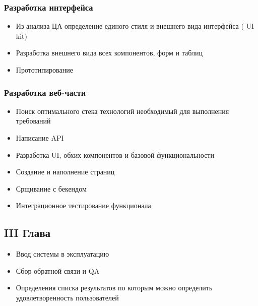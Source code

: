 \documentclass[14pt, timesnewroman]{article}
\begin{document}
\subsubsection{Разработка интерфейса}
\begin{itemize}
    \item Из анализа ЦА определение единого стиля и внешнего вида интерфейса ( UI kit)
    \item Разработка внешнего вида всех компонентов, форм и таблиц
    \item Прототипирование
\end{itemize}
\subsubsection{Разработка веб-части}
\begin{itemize}
    \item Поиск оптимального стека технологий необходимый для выполнения требований
    \item Написание API
    \item Разработка UI, обхих компонентов и базовой функциональности
    \item Создание и наполнение страниц
    \item Срщивание с бекендом
    \item Интеграционное тестирование функционала
\end{itemize}

\subsection{III Глава}
\begin{itemize}
    \item Ввод системы в эксплуатацию
    \item Сбор обратной связи и QA
    \item Определения списка результатов по которым можно определить удовлетворенность пользователей
\end{itemize}
\end{document}
